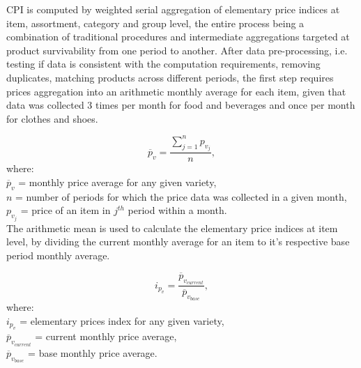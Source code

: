 \documentclass[]{article}
\begin{document}
CPI is computed by weighted serial aggregation of elementary price indices at item, assortment, 
category and group level, the entire process being a combination of traditional procedures\cite{cpi} 
and intermediate aggregations targeted at product survivability from one period to another. After data pre-processing, 
i.e. testing if data is consistent with the computation requirements, removing duplicates, matching 
products across different periods, the first step requires prices aggregation into an arithmetic 
monthly average for each item, given that data was collected 3 times per month for food and 
beverages and once per month for clothes and shoes. 

\begin{equation}\label{eq:1}
\overline{p}_{v} = \frac{\sum_{j=1}^n {p_{v_{j}}}}{n} ,
\end{equation}
where:\\
$\overline{p}_{v}$ = monthly price average for any given variety, \\
$n$ = number of periods for which the price data was collected in a given month, \\
$p_{v_{j}}$ = price of an item in $j^{th}$ period within a month.\\	


The arithmetic mean is used to calculate the elementary 
price indices at item level, by dividing the current monthly average for an item to it's respective base period monthly average. 

\begin{equation}\label{eq:2}
i_{p_{v}} = \frac{\overline{p}_{v_{current}}}{\overline{p}_{v_{base}}} ,
\end{equation}
where:\\
$i_{p_{v}}$ = elementary prices index for any given variety, \\
$\overline{p}_{v_{current}}$ = current monthly price average, \\
$\overline{p}_{v_{base}}$ = base monthly price average.\\
\end{document}
